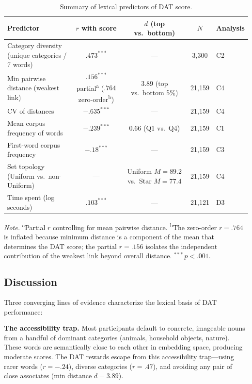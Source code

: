 \documentclass[12pt]{article}
\begin{document}
\begin{table}[htbp]
\centering
\caption{Summary of lexical predictors of DAT score.}
\label{tab:predictors}
\small
\begin{tabular}{@{}p{4.5cm}cccl@{}}
\toprule
Predictor & $r$ with score & $d$ (top vs.\ bottom) & $N$ & Analysis \\
\midrule
Category diversity (unique categories / 7 words) & $.473^{***}$ & --- & 3,300 & C2 \\
Min pairwise distance (weakest link) & $.156^{***}$ partial\textsuperscript{a} ($.764$ zero-order\textsuperscript{b}) & 3.89 (top vs.\ bottom 5\%) & 21,159 & C4 \\
CV of distances & $-.635^{***}$ & --- & 21,159 & C4 \\
Mean corpus frequency of words & $-.239^{***}$ & 0.66 (Q1 vs.\ Q4) & 21,159 & C1 \\
First-word corpus frequency & $-.18^{***}$ & --- & 21,159 & C3 \\
Set topology (Uniform vs.\ non-Uniform) & --- & Uniform $M = 89.2$ vs.\ Star $M = 77.4$ & 21,159 & C4 \\
Time spent (log seconds) & $.103^{***}$ & --- & 21,121 & D3 \\
\bottomrule
\end{tabular}

\smallskip
\noindent\textit{Note.} \textsuperscript{a}Partial $r$ controlling for mean pairwise distance. \textsuperscript{b}The zero-order $r = .764$ is inflated because minimum distance is a component of the mean that determines the DAT score; the partial $r = .156$ isolates the independent contribution of the weakest link beyond overall distance. $^{***}\, p < .001$.
\end{table}

\subsection{Discussion}

Three converging lines of evidence characterize the lexical basis of DAT performance:

\textbf{The accessibility trap.} Most participants default to concrete, imageable nouns from a handful of dominant categories (animals, household objects, nature). These words are semantically close to each other in embedding space, producing moderate scores. The DAT rewards escape from this accessibility trap---using rarer words ($r = -.24$), diverse categories ($r = .47$), and avoiding any pair of close associates (min distance $d = 3.89$).
\end{document}
